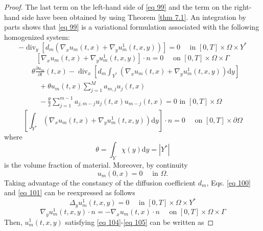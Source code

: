\begin{proof}
The last term on the left-hand side of \eqref{eq 99} and the term on the right-hand side have been obtained by using Theorem \eqref{thm 7.1}. An integration by parts shows that \eqref{eq 99} is a variational formulation associated with the following homogenized system:
\begin{equation}
 -\operatorname{div}_{y}\left[d_{m}\left(\nabla_{x} u_{m}(t, x)+\nabla_{y} u_{m}^{1}(t, x, y)\right)\right]=0 \quad \text { in }[0, T] \times \Omega \times Y^{*}
\label{eq 100}\end{equation}
\begin{equation}
 \left[\nabla_{x} u_{m}(t, x)+\nabla_{y} u_{m}^{1}(t, x, y)\right] \cdot n=0 \quad \text { on }[0, T] \times \Omega \times \Gamma
\label{eq 101}\end{equation}
\begin{equation}
\begin{aligned}
&\theta \frac{\partial u_{m}}{\partial t}(t, x)-\operatorname{div}_{x}\left[d_{m} \int_{Y^{*}}\left(\nabla_{x} u_{m}(t, x)+\nabla_{y} u_{m}^{1}(t, x, y)\right) \mathrm{d} y\right] \\
&\quad+\theta u_{m}(t, x) \sum_{j=1}^{M} a_{m, j} u_{j}(t, x) \\
&\quad-\frac{\theta}{2} \sum_{j=1}^{m-1} a_{j, m-j} u_{j}(t, x) u_{m-j}(t, x)=0 \text { in }[0, T] \times \Omega
\end{aligned}
\label{eq 102}\end{equation}
\begin{equation}
 \left[\int_{Y^{*}}\left(\nabla_{x} u_{m}(t, x)+\nabla_{y} u_{m}^{1}(t, x, y)\right) \mathrm{d} y\right] \cdot n=0 \quad \text { on }[0, T] \times \partial \Omega
\label{eq 103}\end{equation}
where
$$
\theta=\int_{Y} \chi(y) \mathrm{d} y=\left|Y^{*}\right|
$$
is the volume fraction of material. Moreover, by continuity
$$
u_{m}(0, x)=0 \quad \text { in } \Omega .
$$
Taking advantage of the constancy of the diffusion coefficient $d_{m}$, Eqs. \eqref{eq 100} and \eqref{eq 101} can be reexpressed as follows
\begin{equation}
 \Delta_{y} u_{m}^{1}(t, x, y)=0 \quad \text { in }[0, T] \times \Omega \times Y^{*}
\label{eq 104}\end{equation}
\begin{equation}
 \nabla_{y} u_{m}^{1}(t, x, y) \cdot n=-\nabla_{x} u_{m}(t, x) \cdot n \quad \text { on }[0, T] \times \Omega \times \Gamma
\label{eq 105}\end{equation}
Then, $u_{m}^{1}(t, x, y)$ satisfying \eqref{eq 104}-\eqref{eq 105} can be written as 

\end{proof}
